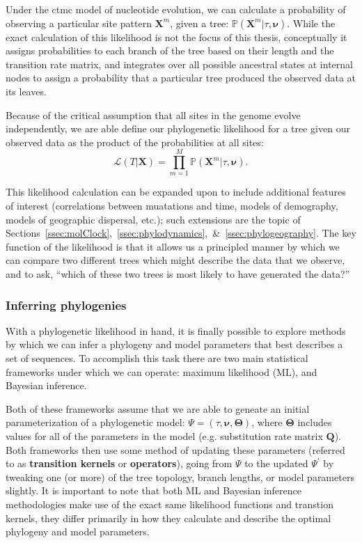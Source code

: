 Under the \gls{ctmc} model of nucleotide evolution, we can calculate a probability of observing a particular site pattern $\mathbf{X}^m$, given a tree: $\mathbb{P}(\mathbf{X}^m | \tau, \mathbf{\nu})$.
While the exact calculation of this likelihood is not the focus of this thesis, conceptually it assigns probabilities to each branch of the tree based on their length and the transition rate matrix, and integrates over all possible ancestral states at internal nodes to assign a probability that a particular tree produced the observed data at its leaves.

Because of the critical assumption that all sites in the genome evolve independently, we are able define our phylogenetic likelihood for a tree given our observed data as the product of the probabilities at all sites:
\begin{equation}\label{eq:likelihood}
  \mathcal{L}(T | \mathbf{X}) = \prod_{m=1}^M \mathbb{P}(\mathbf{X}^m | \tau, \mathbf{\nu}). 
\end{equation}

This likelihood calculation can be expanded upon to include additional features of interest (correlations between muatations and time, models of demography, models of geographic dispersal, etc.); such extensions are the topic of Sections~\ref{ssec:molClock},~\ref{ssec:phylodynamics},~\&~\ref{ssec:phylogeography}.
The key function of the likelihood is that it allows us a principled manner by which we can compare two different trees which might describe the data that we observe, and to ask, ``which of these two trees is most likely to have generated the data?''

\subsubsection{Inferring phylogenies}
With a phylogenetic likelihood in hand, it is finally possible to explore methods by which we can infer a phylogeny and model parameters that best describes a set of sequences.
To accomplish this task there are two main statistical frameworks under which we can operate: maximum likelihood (ML), and Bayesian inference.

Both of these frameworks assume that we are able to geneate an initial parameterization of a phylogenetic model: $\Psi = (\tau, \mathbf{\nu}, \mathbf{\Theta})$, where $\mathbf{\Theta}$ includes values for all of the parameters in the model (e.g. substitution rate matrix $\mathbf{Q}$).
Both frameworks then use some method of updating these parameters (referred to as \textbf{transition kernels} or \textbf{operators}), going from $\Psi$ to the updated $\Psi^{\prime}$ by tweaking one (or more) of the tree topology, branch lengths, or model parameters slightly.
It is important to note that both ML and Bayesian inference methodologies make use of the exact same likelihood functions and transtion kernels, they differ primarily in how they calculate and describe the optimal phylogeny and model parameters.

